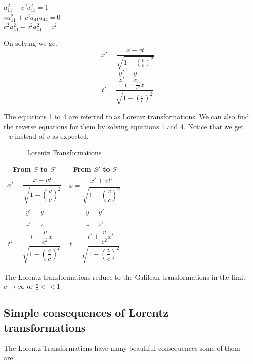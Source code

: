 \documentclass[12pt,a4paper]{article}
\numberwithin{table}{section}
\numberwithin{figure}{section}
\numberwithin{equation}{section}
\theoremstyle{remark}
\theoremstyle{definition}
\begin{document}
\begin{center}
$a_{11}^2-c^2a_{41}^2=1$\\
$va_{11}^2+c^2a_{41}a_{44}=0$\\
$c^2a_{44}^2-v^2a_{11}^2=c^2$\\
\end{center}
On solving we get
\begin{equation}
    x'=\frac{x-vt}{ \sqrt{1-(\frac{v}{c})^2}}
\end{equation}
\begin{equation}
    y'=y
\end{equation}
\begin{equation}
    z'=z
\end{equation}
\begin{equation}
    t'=\frac{t-\frac{v}{c^2}x}{\sqrt{1-(\frac{v}{c})^2}}
\end{equation}

The equations 1 to 4 are referred to as Lorentz transformations. We can also find the reverse equations for them by solving equations 1 and 4. Notice that we get $-v$ instead of $v$ as expected. 
\begin{table}[H]
\begin{center}
\begin{tabular}{||c|c||}
\hline
From $S$ to $S'$ & From $S'$ to $S$\\
\hline
$ x'=\dfrac{x-vt}{ \sqrt{1-(\dfrac{v}{c})^2}}$ & $ x=\dfrac{x'+vt'}{ \sqrt{1-(\dfrac{v}{c})^2}}$\\ 
$y' = y$ & $y = y'$\\  
$z' = z$ & $z = z'$\\ 
$t' = \dfrac{t-\dfrac{v}{c^2}x}{\sqrt{1-(\dfrac{v}{c})^2}}$ & $t = \dfrac{t'+\dfrac{v}{c^2}x'}{\sqrt{1-(\dfrac{v}{c})^2}}$\\
\hline

\end{tabular}
\caption{Lorentz Transformations}
 \label{table:3}
 
\end{center}
\end{table}


The Lorentz transformations reduce to the Galilean transformations in the limit  $c \to \infty $ or $\frac{v}{c}<<1$
\subsection{Simple consequences of Lorentz transformations}
The Lorentz Transformations have many beautiful consequences some of them are:
\end{document}
